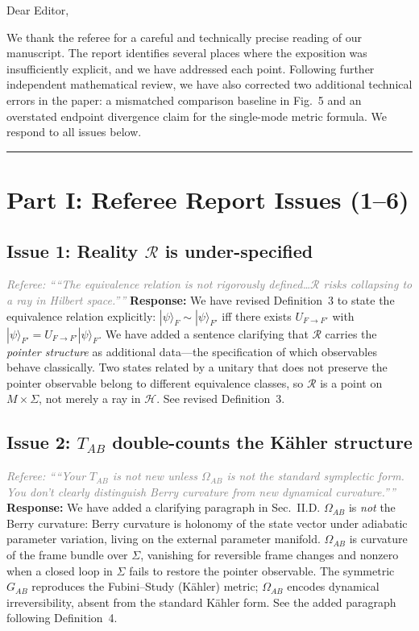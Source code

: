 \documentclass[12pt]{article}
\newcommand{\referee}[1]{\medskip\noindent\textcolor{gray}{\textit{Referee: ``#1''}}\medskip}
\newcommand{\response}[1]{\noindent\textbf{Response:} #1\medskip}
\begin{document}
\noindent
Dear Editor,

\medskip
We thank the referee for a careful and technically precise reading of our manuscript.
The report identifies several places where the exposition was insufficiently explicit,
and we have addressed each point. Following further independent mathematical review,
we have also corrected two additional technical errors in the paper: a mismatched
comparison baseline in Fig.~5 and an overstated endpoint divergence claim for the
single-mode metric formula. We respond to all issues below.

\bigskip\hrule\bigskip

\section*{Part I: Referee Report Issues (1--6)}

\subsection*{Issue 1: Reality $\mathcal{R}$ is under-specified}
\referee{``The equivalence relation is not rigorously defined\ldots $\mathcal{R}$ risks
collapsing to a ray in Hilbert space.''}
\response{We have revised Definition~3 to state the equivalence relation explicitly:
$|\psi\rangle_F \sim |\psi\rangle_{F'}$ iff there exists $U_{F\to F'}$ with
$|\psi\rangle_{F'} = U_{F\to F'}|\psi\rangle_F$. We have added a sentence
clarifying that $\mathcal{R}$ carries the \emph{pointer structure} as additional
data---the specification of which observables behave classically. Two states related
by a unitary that does not preserve the pointer observable belong to different
equivalence classes, so $\mathcal{R}$ is a point on $M\times\Sigma$, not merely a
ray in $\mathcal{H}$. See revised Definition~3.}

\subsection*{Issue 2: $T_{AB}$ double-counts the K\"{a}hler structure}
\referee{``Your $T_{AB}$ is not new unless $\Omega_{AB}$ is not the standard symplectic
form. You don't clearly distinguish Berry curvature from new dynamical curvature.''}
\response{We have added a clarifying paragraph in Sec.~II.D. $\Omega_{AB}$ is
\emph{not} the Berry curvature: Berry curvature is holonomy of the state vector under
adiabatic parameter variation, living on the external parameter manifold. $\Omega_{AB}$
is curvature of the frame bundle over $\Sigma$, vanishing for reversible frame changes
and nonzero when a closed loop in $\Sigma$ fails to restore the pointer observable.
The symmetric $G_{AB}$ reproduces the Fubini--Study (K\"{a}hler) metric;
$\Omega_{AB}$ encodes dynamical irreversibility, absent from the standard K\"{a}hler
form. See the added paragraph following Definition~4.}
\end{document}
